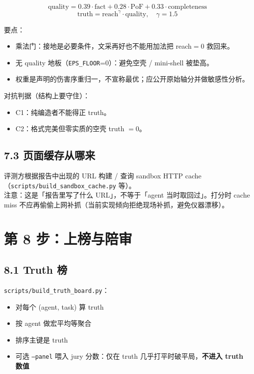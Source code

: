 \documentclass[11pt,a4paper]{article}
\begin{document}
\[
\text{quality} = 0.39\cdot\text{fact} + 0.28\cdot\text{PoF} + 0.33\cdot\text{completeness}
\]
\[
\text{truth} = \text{reach}^{\gamma}\cdot\text{quality},\quad \gamma=1.5
\]

要点：
\begin{itemize}[leftmargin=1.5em]
  \item 乘法门：接地是必要条件，文采再好也不能用加法把 reach$=0$ 救回来。
  \item 无 quality 地板（\texttt{EPS\_FLOOR}=0）：避免空壳 / mini-shell 被垫高。
  \item 权重是声明的伤害序重归一，不宣称最优；应公开原始轴分并做敏感性分析。
\end{itemize}

对抗判据（结构上要守住）：
\begin{itemize}[leftmargin=1.5em]
  \item C1：纯编造者不能得正 truth。
  \item C2：格式完美但零实质的空壳 truth $=0$。
\end{itemize}

\subsection{7.3 页面缓存从哪来}

评测方根据报告中出现的 URL 构建 / 查询 sandbox HTTP cache（\texttt{scripts/build\_sandbox\_cache.py} 等）。\\
注意：这是「报告里写了什么 URL」，不等于「agent 当时取回过」。打分时 cache miss 不应再偷偷上网补抓（当前实现倾向拒绝现场补抓，避免仪器漂移）。

\section{第 8 步：上榜与陪审}

\subsection{8.1 Truth 榜}

\texttt{scripts/build\_truth\_board.py}：
\begin{itemize}[leftmargin=1.5em]
  \item 对每个 (agent, task) 算 truth
  \item 按 agent 做宏平均等聚合
  \item 排序主键是 truth
  \item 可选 \texttt{--panel} 喂入 jury 分数：仅在 truth 几乎打平时破平局，\textbf{不进入 truth 数值}
\end{itemize}
\end{document}
